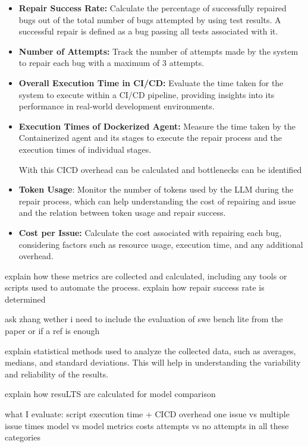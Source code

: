 \begin{itemize}
    \item\textbf{Repair Success Rate:} Calculate the percentage of successfully repaired bugs out of the total number of bugs attempted by using test results.
          A successful repair is defined as a bug passing all tests associated with it.


    \item\textbf{Number of Attempts:} Track the number of attempts made by the system to repair each bug with a maximum of 3 attempts.


    \item\textbf{Overall Execution Time in CI/CD:} Evaluate the time taken for the system to execute within a CI/CD pipeline, providing insights into its performance in real-world development environments.


    \item\textbf{Execution Times of Dockerized Agent:} Measure the time taken by the Containerized agent and its stages to execute the repair process and the  execution times of individual stages.

          With this CICD overhead can be calculated and bottlenecks can be identified


    \item\textbf{Token Usage}: Monitor the number of tokens used by the LLM during the repair process, which can help understanding the cost of repairing and issue and the relation between token usage and repair success.


    \item\textbf{Cost per Issue:} Calculate the cost associated with repairing each bug, considering factors such as resource usage, execution time, and any additional overhead.
\end{itemize}

explain how these metrics are collected and calculated, including any tools or scripts used to automate the process.
explain how repair success rate is determined

ask zhang wether i need to include the evaluation of swe bench lite from the paper or if a ref is enough

explain statistical methods used to analyze the collected data, such as averages, medians, and standard deviations. This will help in understanding the variability and reliability of the results.

explain how resuLTS are calculated for model comparison

what I evaluate:
script execution time + CICD overhead
one issue vs multiple issue times
model vs model metrics
costs
attempts vs no attempts in all these categories
